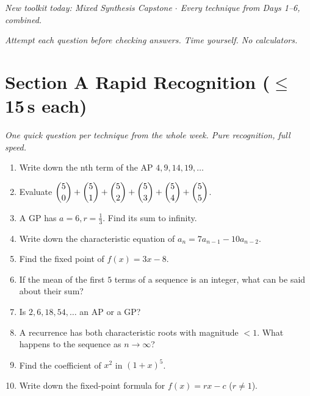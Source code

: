 \documentclass[11pt,a4paper]{article}
\begin{document}
\noindent\textit{New toolkit today: Mixed Synthesis Capstone $\cdot$ Every technique from Days 1--6, combined.}

\vspace{2pt}
\noindent\textit{Attempt each question before checking answers. Time yourself. No calculators.}

\section*{Section A \quad Rapid Recognition \hfill{\normalfont\small($\leq$15\,s each)}}

\noindent\textit{One quick question per technique from the whole week. Pure recognition, full speed.}

\begin{enumerate}

\item Write down the nth term of the AP $4,9,14,19,\ldots$

\item Evaluate $\dbinom50+\dbinom51+\dbinom52+\dbinom53+\dbinom54+\dbinom55$.

\item A GP has $a=6,r=\tfrac13$. Find its sum to infinity.

\item Write down the characteristic equation of $a_n=7a_{n-1}-10a_{n-2}$.

\item Find the fixed point of $f(x)=3x-8$.

\item If the mean of the first $5$ terms of a sequence is an integer, what can be said about their sum?

\item Is $2,6,18,54,\ldots$ an AP or a GP?

\item A recurrence has both characteristic roots with magnitude $<1$. What happens to the sequence as $n\to\infty$?

\item Find the coefficient of $x^2$ in $(1+x)^5$.

\item Write down the fixed-point formula for $f(x)=rx-c$ ($r\neq1$).

\end{enumerate}
\end{document}
